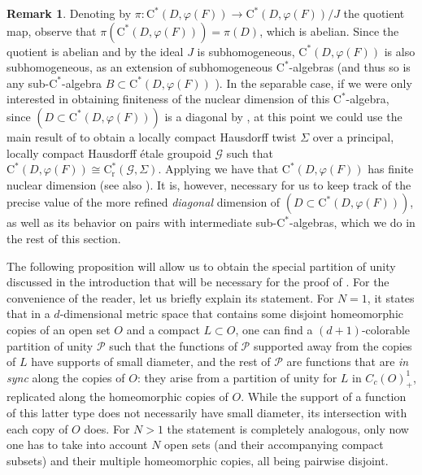 \documentclass[11pt,a4paper]{amsart}
\theoremstyle{definition}
\newtheorem{remark}[theorem]{Remark}
\numberwithin{equation}{section}
\newcommand{\mc}[1]{\mathcal{#1}}
\begin{document}
\begin{remark}\label{rmk:subhomogeneity}
Denoting by $\pi\colon \mathrm{C}^\ast(D,\varphi(F))\to \mathrm{C}^\ast(D,\varphi(F))/J$ the quotient map, observe that $\pi(\mathrm{C}^\ast(D,\varphi(F)))=\pi(D)$, which is abelian. Since the quotient is abelian and by  the ideal $J$ is subhomogeneous, $\mathrm{C}^\ast(D,\varphi(F))$ is also subhomogeneous, as an extension of subhomogeneous $\mathrm{C}^\ast$-algebras (and thus so is any sub-$\mathrm{C}^\ast$-algebra $B\subset\mathrm{C}^\ast(D,\varphi(F))$ \cite[Proposition~IV.1.4.3]{Bla06}). In the separable case, if we were only interested in obtaining finiteness of the nuclear dimension of this $\mathrm{C}^\ast$-algebra, since $(D\subset \mathrm{C}^\ast(D,\varphi(F)))$ is a diagonal by \cite{BrownExelFullerPittsReznikoff21, BrownExelFullerPittsReznikoff21corrigendum}, at this point we could use the main result of \cite{Kum86} to obtain a locally compact Hausdorff twist $\Sigma$ over a principal, locally compact Hausdorff {\'e}tale groupoid $\mc{G}$ such that $\mathrm{C}^\ast(D,\varphi(F))\cong \mathrm{C}^\ast_\mathrm{r}(\mc{G},\Sigma)$. Applying \cite[Theorem~B]{BonickeLi24} we have that $\mathrm{C}^\ast(D,\varphi(F))$ has finite nuclear dimension (see also \cite{Win04}). It is, however, necessary for us to keep track of the precise value of the more refined \emph{diagonal} dimension of $(D\subset\mathrm{C}^\ast(D,\varphi(F)))$, as well as its behavior on pairs with intermediate sub-$\mathrm{C}^\ast$-algebras, which we do in the rest of this section.
\end{remark}

The following proposition will allow us to obtain the special partition of unity discussed in the introduction that will be necessary for the proof of . For the convenience of the reader, let us briefly explain its statement. For $N=1$, it states that in a $d$-dimensional metric space that contains some disjoint homeomorphic copies of an open set $O$ and a compact $L\subset O$, one can find a $(d+1)$-colorable partition of unity $\mc{P}$ such that the functions of $\mc{P}$ supported away from the copies of $L$ have supports of small diameter, and the rest of $\mc{P}$ are functions that are \emph{in sync} along the copies of $O$: they arise from a partition of unity for $L$ in $C_c(O)_+^1$, replicated along the homeomorphic copies of $O$. While the support of a function of this latter type does not necessarily have small diameter, its intersection with each copy of $O$ does. For $N>1$ the statement is completely analogous, only now one has to take into account $N$ open sets (and their accompanying compact subsets) and their multiple homeomorphic copies, all being pairwise disjoint.
\end{document}

